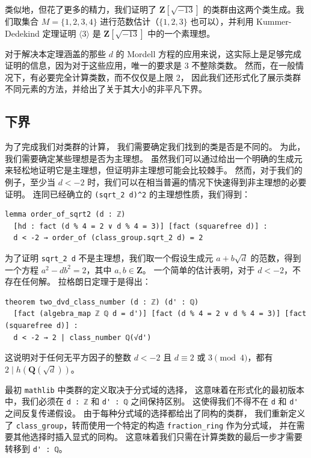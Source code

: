 \documentclass[sigplan,10pt,nonacm,
screen]{acmart} \settopmatter{printfolios=true,printccs=false,printacmref=false}
\newcommand{\mathlib}{\lstinline{mathlib}\xspace}
\newcommand{\QQ}{\mathbf{Q}}
\newcommand{\ZZ}{\mathbf{Z}}
\begin{document}
类似地，但花了更多的精力，我们证明了 $\ZZ[\sqrt{-13}]$ 的类群由这两个类生成。我们取集合 $M=\{1,2,3,4\}$ 进行范数估计（$\{1,2,3\}$ 也可以），并利用 Kummer-Dedekind 定理证明 $\langle 3 \rangle$ 是 $\ZZ[\sqrt{-13}]$ 中的一个素理想。

对于解决本定理涵盖的那些 $d$ 的 Mordell 方程的应用来说，这实际上是足够完成证明的信息，因为对于这些应用，唯一的要求是 3 不整除类数。
然而，在一般情况下，有必要完全计算类数，而不仅仅是上限 2，
因此我们还形式化了展示类群不同元素的方法，并给出了关于其大小的非平凡下界。

\subsection{下界}

为了完成我们对类群的计算，
我们需要确定我们找到的类是否是不同的。
为此，我们需要确定某些理想是否为主理想。
虽然我们可以通过给出一个明确的生成元来轻松地证明它是主理想，但证明非主理想可能会比较棘手。
然而，对于我们的例子，至少当 $d < -2$ 时，我们可以在相当普遍的情况下快速得到非主理想的必要证明。
连同已经确立的 \lstinline{(sqrt_2 d)^2} 的主理想性质，我们得到：

\begin{lstlisting}
lemma order_of_sqrt2 (d : ℤ)
  [hd : fact (d % 4 = 2 ∨ d % 4 = 3)] [fact (squarefree d)] :
  d < -2 → order_of (class_group.sqrt_2 d) = 2
\end{lstlisting}

为了证明 \lstinline{sqrt_2 d} 不是主理想，我们取一个假设生成元 $a + b\sqrt{d}$ 的范数，得到一个方程 $a^2 - d b^2 = 2$，其中 $a, b \in \ZZ$。
一个简单的估计表明，对于 $d < -2$，不存在任何解。
拉格朗日定理于是得出：
\begin{lstlisting}
theorem two_dvd_class_number (d : ℤ) (d' : ℚ)
  [fact (algebra_map ℤ ℚ d = d')] [fact (d % 4 = 2 ∨ d % 4 = 3)] [fact (squarefree d)] :
  d < -2 → 2 | class_number ℚ(√d')
\end{lstlisting}
这说明对于任何无平方因子的整数 $d<-2$ 且 $d \equiv 2 \text{ 或 } 3 \pmod{4}$，都有 $2 \mid h(\QQ(\sqrt{d}))$。

最初 \mathlib 中类群的定义取决于分式域的选择，
这意味着在形式化的最初版本中，我们必须在 \lstinline{d : ℤ} 和 \lstinline{d' : ℚ} 之间保持区别。
这使得我们不得不在 \lstinline{d} 和 \lstinline{d'} 之间反复传递假设。
由于每种分式域的选择都给出了同构的类群，
我们重新定义了 \lstinline{class_group}，转而使用一个特定的构造 \lstinline{fraction_ring} 作为分式域，
并在需要其他选择时插入显式的同构。
这意味着我们只需在计算类数的最后一步才需要转移到 \lstinline{d' : ℚ}。
\end{document}
